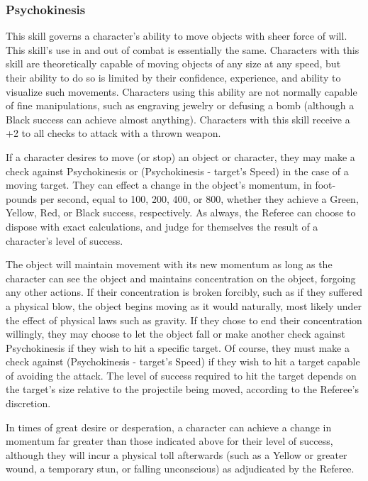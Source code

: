 \documentclass[oneside]{book}
\begin{document}
\begin{multicols}{2}
\subsubsection{Psychokinesis}
This skill governs a character's ability to move objects with sheer force of will. This skill's use in and out of combat is essentially the same. Characters with this skill are theoretically capable of moving objects of any size at any speed, but their ability to do so is limited by their confidence, experience, and ability to visualize such movements. Characters using this ability are not normally capable of fine manipulations, such as engraving jewelry or defusing a bomb (although a Black success can achieve almost anything). Characters with this skill receive a +2 to all checks to attack with a thrown weapon. 

If a character desires to move (or stop) an object or character, they may make a check against Psychokinesis or (Psychokinesis - target's Speed) in the case of a moving target. They can effect a change in the object's momentum, in foot-pounds per second, equal to 100, 200, 400, or 800, whether they achieve a Green, Yellow, Red, or Black success, respectively. As always, the Referee can choose to dispose with exact calculations, and judge for themselves the result of a character's level of success.

The object will maintain movement with its new momentum as long as the character can see the object and maintains concentration on the object, forgoing any other actions. If their concentration is broken forcibly, such as if they suffered a physical blow, the object begins moving as it would naturally, most likely under the effect of physical laws such as gravity. If they chose to end their concentration willingly, they may choose to let the object fall or make another check against Psychokinesis if they wish to hit a specific target. Of course, they must make a check against (Psychokinesis - target's Speed) if they wish to hit a target capable of avoiding the attack. The level of success required to hit the target depends on the target's size relative to the projectile being moved, according to the Referee's discretion. 

In times of great desire or desperation, a character can achieve a change in momentum far greater than those indicated above for their level of success, although they will incur a physical toll afterwards (such as a Yellow or greater wound, a temporary stun, or falling unconscious) as adjudicated by the Referee.


\end{multicols}
\end{document}
